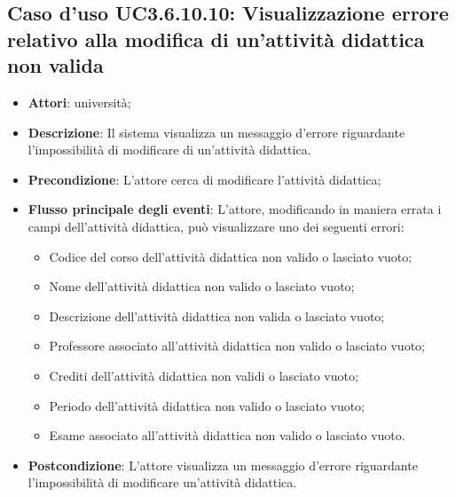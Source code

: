 \subsection{Caso d'uso \texorpdfstring{UC3.6.10.10}{UC3.6.10.10}: Visualizzazione errore relativo alla modifica di un’attività didattica non valida}
\begin{itemize}
\item \textbf{Attori}: università;
\item \textbf{Descrizione}: Il sistema visualizza un messaggio d'errore riguardante l'impossibilità di modificare di un'attività didattica.

\item \textbf{Precondizione}: L'attore cerca di modificare l'attività didattica;

\item \textbf{Flusso principale degli eventi}: L'attore, modificando in maniera errata i campi dell’attività didattica, può visualizzare uno dei seguenti errori: \begin{itemize} \item Codice del corso dell’attività didattica non valido o lasciato vuoto; \item Nome dell’attività didattica non valido o lasciato vuoto; \item Descrizione dell’attività didattica non valida o lasciato vuoto; \item Professore associato all’attività didattica non valido o lasciato vuoto; \item Crediti dell’attività didattica non validi o lasciato vuoto; \item Periodo dell’attività didattica non valido o lasciato vuoto; \item Esame associato all’attività didattica non valido o lasciato vuoto. \end{itemize}
\item \textbf{Postcondizione}: L'attore visualizza un messaggio d'errore riguardante l'impossibilità di modificare un'attività didattica.

\end{itemize}
